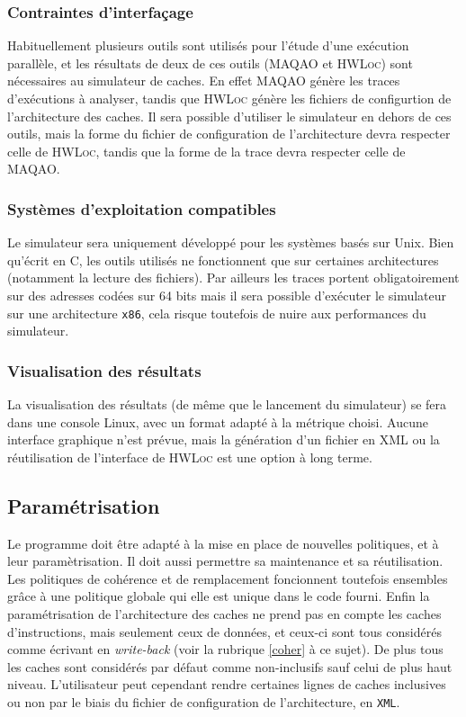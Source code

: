 \subsubsection{Contraintes d'interfaçage}

Habituellement plusieurs outils sont utilisés pour l'étude d'une exécution parallèle, et les résultats de deux de ces outils (\textsc{MAQAO} et \textsc{HWLoc}) sont nécessaires au simulateur de caches. En effet \textsc{MAQAO} génère les traces d'exécutions à analyser, tandis que \textsc{HWLoc}
génère les fichiers de configurtion de l'architecture des caches. Il sera possible d'utiliser le simulateur en dehors de ces outils, mais la forme du fichier de configuration de l'architecture devra respecter celle de \textsc{HWLoc}, tandis que la forme de la trace devra respecter celle de \textsc{MAQAO}.

\subsubsection{Systèmes d'exploitation compatibles}

Le simulateur sera uniquement développé pour les systèmes basés sur Unix. Bien qu'écrit en \textsc{C}, les outils utilisés ne fonctionnent que sur certaines architectures (notamment la lecture des fichiers). Par ailleurs les traces portent obligatoirement sur des adresses codées sur 64 bits mais il sera possible d'exécuter le simulateur sur une architecture \verb!x86!, cela risque toutefois de nuire aux performances du simulateur.

\subsubsection{Visualisation des résultats}

La visualisation des résultats (de même que le lancement du simulateur) se fera dans une console Linux, avec un format adapté à la métrique choisi. Aucune interface graphique n'est prévue, mais la génération d'un fichier en \textsc{XML} ou la réutilisation de l'interface de \textsc{HWLoc} est une option à long terme.

\subsection{Paramétrisation}

Le programme doit être adapté à la mise en place de nouvelles politiques, et à leur paramètrisation. Il doit aussi permettre sa maintenance et sa réutilisation. Les politiques de cohérence et de remplacement foncionnent toutefois ensembles grâce à une politique globale qui elle est unique dans le code fourni. Enfin la paramétrisation de l'architecture des caches ne prend pas en compte les caches d'instructions, mais seulement ceux de données, et ceux-ci sont tous considérés comme écrivant en \emph{write-back} (voir la rubrique \ref{coher} à ce sujet). De plus tous les caches sont considérés par défaut comme non-inclusifs sauf celui de plus haut niveau. L'utilisateur peut cependant rendre certaines lignes de caches inclusives ou non par le biais du fichier de configuration de l'architecture, en \texttt{XML}.



